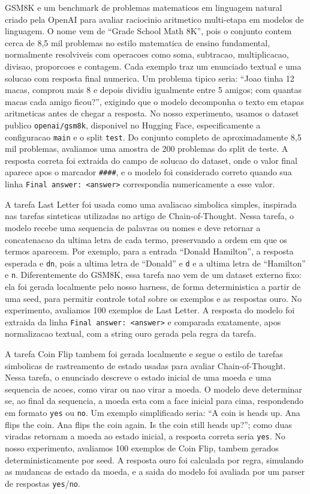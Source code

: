\documentclass[a4paper,12pt]{article}
\begin{document}
GSM8K e um benchmark de problemas matematicos em linguagem natural criado pela
OpenAI para avaliar raciocinio aritmetico multi-etapa em modelos de linguagem.
O nome vem de ``Grade School Math 8K'', pois o conjunto contem cerca de 8,5 mil
problemas no estilo matematica de ensino fundamental, normalmente resolviveis
com operacoes como soma, subtracao, multiplicacao, divisao, proporcoes e
contagem. Cada exemplo traz um enunciado textual e uma solucao com resposta
final numerica. Um problema tipico seria: ``Joao tinha 12 macas, comprou mais 8
e depois dividiu igualmente entre 5 amigos; com quantas macas cada amigo
ficou?'', exigindo que o modelo decomponha o texto em etapas aritmeticas antes
de chegar a resposta. No nosso experimento, usamos o dataset publico
\texttt{openai/gsm8k}, disponivel no Hugging Face, especificamente a
configuracao \texttt{main} e o split \texttt{test}. Do conjunto completo de
aproximadamente 8,5 mil problemas, avaliamos uma amostra de 200 problemas do
split de teste. A resposta correta foi extraida do campo de solucao do dataset,
onde o valor final aparece apos o marcador \texttt{\#\#\#\#}, e o modelo foi
considerado correto quando sua linha \texttt{Final answer: <answer>} correspondia
numericamente a esse valor.

A tarefa Last Letter foi usada como uma avaliacao simbolica simples, inspirada
nas tarefas sinteticas utilizadas no artigo de Chain-of-Thought. Nessa tarefa,
o modelo recebe uma sequencia de palavras ou nomes e deve retornar a
concatenacao da ultima letra de cada termo, preservando a ordem em que os termos
aparecem. Por exemplo, para a entrada ``Donald Hamilton'', a resposta esperada
e \texttt{dn}, pois a ultima letra de ``Donald'' e \texttt{d} e a ultima letra
de ``Hamilton'' e \texttt{n}. Diferentemente do GSM8K, essa tarefa nao vem de
um dataset externo fixo: ela foi gerada localmente pelo nosso harness, de forma
deterministica a partir de uma seed, para permitir controle total sobre os
exemplos e as respostas ouro. No experimento, avaliamos 100 exemplos de Last
Letter. A resposta do modelo foi extraida da linha \texttt{Final answer:
<answer>} e comparada exatamente, apos normalizacao textual, com a string ouro
gerada pela regra da tarefa.

A tarefa Coin Flip tambem foi gerada localmente e segue o estilo de tarefas
simbolicas de rastreamento de estado usadas para avaliar Chain-of-Thought. Nessa
tarefa, o enunciado descreve o estado inicial de uma moeda e uma sequencia de
acoes, como virar ou nao virar a moeda. O modelo deve determinar se, ao final da
sequencia, a moeda esta com a face inicial para cima, respondendo em formato
\texttt{yes} ou \texttt{no}. Um exemplo simplificado seria: ``A coin is heads
up. Ana flips the coin. Ana flips the coin again. Is the coin still heads
up?''; como duas viradas retornam a moeda ao estado inicial, a resposta correta
seria \texttt{yes}. No nosso experimento, avaliamos 100 exemplos de Coin Flip,
tambem gerados deterministicamente por seed. A resposta ouro foi calculada por
regra, simulando as mudancas de estado da moeda, e a saida do modelo foi
avaliada por um parser de respostas \texttt{yes}/\texttt{no}.
\end{document}
